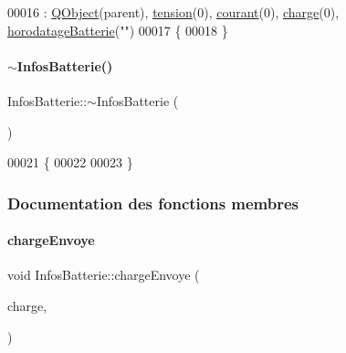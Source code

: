 \begin{DoxyCode}
00016                                             : \hyperlink{class_q_object}{QObject}(parent), \hyperlink{class_infos_batterie_a45d09805075337f7f2d4b84d02a2ee47}{tension}(0), 
      \hyperlink{class_infos_batterie_a417f025b2ccddea7d28f80df4413945a}{courant}(0), \hyperlink{class_infos_batterie_af3ad72cdbbf13f2dec6d81f078a2c0d2}{charge}(0), \hyperlink{class_infos_batterie_a261067aff87023bccd60e59961ef1ffc}{horodatageBatterie}(\textcolor{stringliteral}{""})
00017 \{ 
00018 \}
\end{DoxyCode}
\mbox{\label{class_infos_batterie_a5c59c1d607d25b46fb7c3768a01f4ec5}} 
\paragraph{\texorpdfstring{$\sim$\+Infos\+Batterie()}{~InfosBatterie()}}
{\footnotesize\ttfamily Infos\+Batterie\+::$\sim$\+Infos\+Batterie (\begin{DoxyParamCaption}{ }\end{DoxyParamCaption})}


\begin{DoxyCode}
00021 \{
00022 
00023 \}
\end{DoxyCode}


\subsubsection{Documentation des fonctions membres}
\mbox{\label{class_infos_batterie_a75ef2e971d86ae3b66a787d53e3d5c63}} 
\paragraph{\texorpdfstring{charge\+Envoye}{chargeEnvoye}}
{\footnotesize\ttfamily void Infos\+Batterie\+::charge\+Envoye (\begin{DoxyParamCaption}\item[{const double}]{charge,  }\item[{Q\+String}]{ }\end{DoxyParamCaption})\hspace{0.3cm}{\ttfamily [signal]}}



